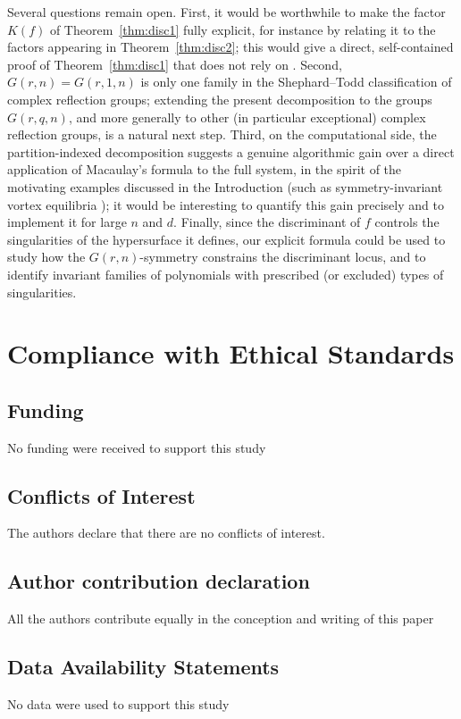 \documentclass[12pt]{amsart}
\theoremstyle{definition}
\begin{document}
Several questions remain open. First, it would be worthwhile to make the factor $K(f)$ of Theorem~\ref{thm:disc1} fully explicit, for instance by relating it to the factors appearing in Theorem~\ref{thm:disc2}; this would give a direct, self-contained proof of Theorem~\ref{thm:disc1} that does not rely on \citep{BuseJouanolou2014}. Second, $G(r,n)=G(r,1,n)$ is only one family in the Shephard--Todd classification of complex reflection groups; extending the present decomposition to the groups $G(r,q,n)$, and more generally to other (in particular exceptional) complex reflection groups, is a natural next step. Third, on the computational side, the partition-indexed decomposition suggests a genuine algorithmic gain over a direct application of Macaulay's formula to the full system, in the spirit of the motivating examples discussed in the Introduction (such as symmetry-invariant vortex equilibria \citep{FaugereSvartz2012}); it would be interesting to quantify this gain precisely and to implement it for large $n$ and $d$. Finally, since the discriminant of $f$ controls the singularities of the hypersurface it defines, our explicit formula could be used to study how the $G(r,n)$-symmetry constrains the discriminant locus, and to identify invariant families of polynomials with prescribed (or excluded) types of singularities.


\section*{Compliance with Ethical Standards}
\subsection*{Funding}
No funding were received to support this study 
\subsection*{Conflicts of Interest}
The authors declare that there are no conflicts of interest.
\subsection*{Author contribution declaration}  All the authors contribute equally in the conception and writing of this paper
\subsection*{Data Availability Statements}
No data were used to support this study
\end{document}
